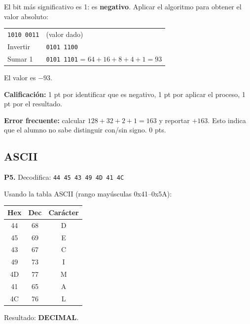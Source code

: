 \documentclass[12pt, oneside]{article}
\begin{document}
\begin{notaprofesor}
  El bit más significativo es 1: es \textbf{negativo}.
  Aplicar el algoritmo para obtener el valor absoluto:
  \begin{center}
  \begin{tabular}{ll}
    \texttt{1010 0011} & (valor dado) \\
    Invertir           & \texttt{0101 1100} \\
    Sumar 1            & \texttt{0101 1101} = $64+16+8+4+1 = 93$ \\
  \end{tabular}
  \end{center}
  El valor es $-93$.

  \textbf{Calificación:} 1 pt por identificar que es negativo, 1 pt por
  aplicar el proceso, 1 pt por el resultado.

  \textbf{Error frecuente:} calcular $128+32+2+1 = 163$ y reportar $+163$.
  Esto indica que el alumno no sabe distinguir con/sin signo.  0 pts.
\end{notaprofesor}

\subsection{ASCII}

\textbf{P5.} Decodifica: \texttt{44 45 43 49 4D 41 4C}

\begin{notaprofesor}
  Usando la tabla ASCII (rango mayúsculas 0x41–0x5A):
  \begin{center}
  \begin{tabular}{ccc}
    \toprule
    Hex & Dec & Carácter \\
    \midrule
    44 & 68 & D \\
    45 & 69 & E \\
    43 & 67 & C \\
    49 & 73 & I \\
    4D & 77 & M \\
    41 & 65 & A \\
    4C & 76 & L \\
    \bottomrule
  \end{tabular}
  \end{center}
  Resultado: \textbf{DECIMAL}.
\end{notaprofesor}
\end{document}
